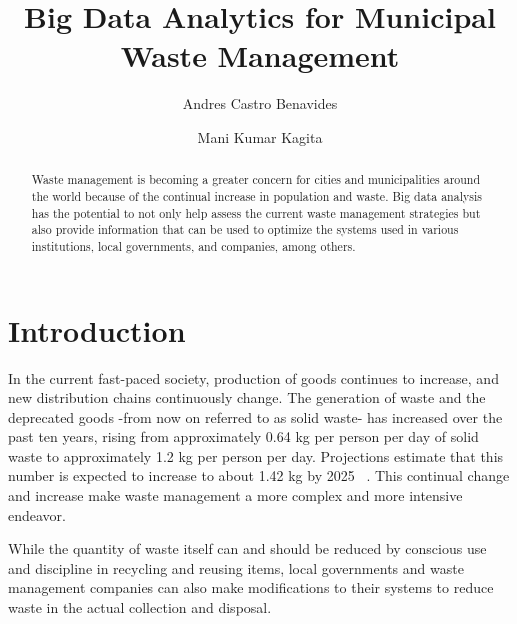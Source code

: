 \documentclass[sigconf]{acmart}
\begin{document}
\title{Big Data Analytics for Municipal Waste Management}

\author{Andres Castro Benavides}

\author{Mani Kumar Kagita}
\renewcommand{\shortauthors}{A. Castro et al.}

\begin{abstract}
Waste management is becoming a greater concern for cities and municipalities around the world because of the continual increase in population and waste. Big data analysis has the potential to not only help assess the current waste management strategies but also provide information that can be used to optimize the systems used in various institutions, local governments, and companies, among others.
\end{abstract}


\maketitle

\section{Introduction}

In the current fast-paced society,  production of goods continues to increase, and new distribution chains continuously change. The generation of waste and the deprecated goods -from now on referred to as solid waste- has increased over the past ten years, rising from approximately 0.64 kg per person per day of solid waste to approximately 1.2 kg per person per day.  Projections estimate that this number is expected to increase to about 1.42 kg by 2025 ~\cite{hoornweg2012}. This continual change and increase make waste management a more complex and more intensive endeavor.  

While the quantity of waste itself can and should be reduced by conscious use and discipline in recycling and reusing items, local governments and waste management companies can also make modifications to their systems to reduce waste in the actual collection and disposal.
\end{document}

